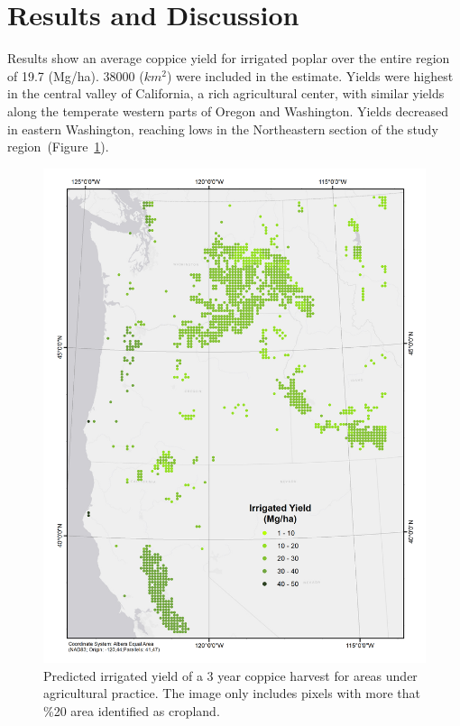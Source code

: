 \documentclass[preprint,review,12pt]{elsarticle}
\begin{document}
\section{Results and Discussion}

Results show an average coppice yield for irrigated poplar over the
entire region of 19.7 (Mg/ha).  38000 ($km^2$) were included in the
estimate.  Yields were highest in the central valley of California, a
rich agricultural center, with similar yields along the temperate
western parts of Oregon and Washington.  Yields decreased in eastern
Washington, reaching lows in the Northeastern section of the study
region~(Figure~\ref{fig:irrigated_yield}).

\begin{figure}[hp]
  \centering
  \includegraphics[width=1.0\linewidth]{irrigated_yield}
  \caption{Predicted irrigated yield of a 3 year coppice harvest for
    areas under agricultural practice.  The image only
    includes pixels with more that \%20 area identified as cropland.}
  \label{fig:irrigated_yield}
\end{figure}
\end{document}
